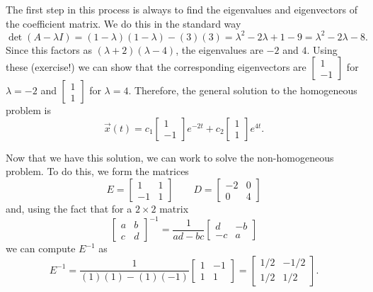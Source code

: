 \documentclass{ximera}
\begin{document}
\begin{exampleSol}
The first step in this process is always to find the eigenvalues and eigenvectors of the coefficient matrix. We do this in the standard way
\begin{equation*}
    \det(A - \lambda I) = (1-\lambda)(1-\lambda) - (3)(3) = \lambda^2 - 2\lambda + 1 - 9 = \lambda^2 - 2 \lambda - 8.
\end{equation*}
Since this factors as $(\lambda + 2)(\lambda - 4)$, the eigenvalues are $-2$ and $4$. Using these (exercise!) we can show that the corresponding eigenvectors are $\left[\begin{smallmatrix} 1 \\ -1 \end{smallmatrix}\right]$ for $\lambda = -2$ and $\left[\begin{smallmatrix} 1 \\ 1 \end{smallmatrix}\right]$ for $\lambda = 4$. Therefore, the general solution to the homogeneous problem is
\begin{equation*}
    \vec{x}(t) = c_1 \begin{bmatrix} 1 \\ -1 \end{bmatrix}e^{-2t} + c_2 \begin{bmatrix} 1 \\ 1 \end{bmatrix}e^{4t}.
\end{equation*}

Now that we have this solution, we can work to solve the non-homogeneous problem. To do this, we form the matrices
\begin{equation*}
    E = \begin{bmatrix} 1 & 1 \\ -1 & 1 \end{bmatrix} \qquad D = \begin{bmatrix} -2 & 0 \\ 0 & 4 \end{bmatrix}
\end{equation*}
and, using the fact that for a $ 2 \times 2$ matrix
\begin{equation*}
    \begin{bmatrix} 
        a& b \\
        c & d 
    \end{bmatrix}^{-1} 
    = \frac{1}{ad-bc} 
    \begin{bmatrix} 
        d & -b \\ 
        -c & a
    \end{bmatrix}
\end{equation*} 
we can compute $E^{-1}$ as
\begin{equation*}
    E^{-1} = \frac{1}{(1)(1) - (1)(-1)} \begin{bmatrix} 1 & -1 \\ 1 & 1 \end{bmatrix} = \begin{bmatrix} 1/2 & -1/2 \\ 1/2 & 1/2 \end{bmatrix}.
\end{equation*}


\end{exampleSol}
\end{document}
